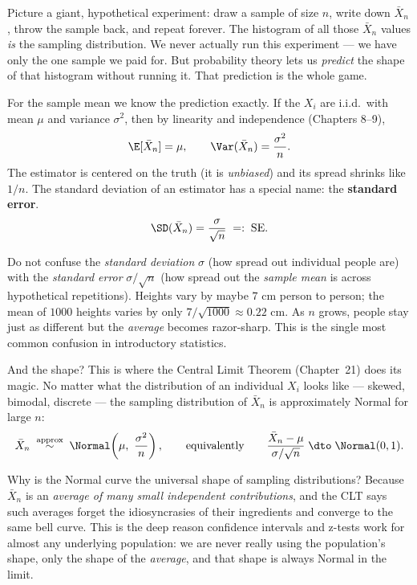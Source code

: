 \begin{intuitionbox}
Picture a giant, hypothetical experiment: draw a sample of size $n$, write down
$\bar X_n$, throw the sample back, and repeat forever. The histogram of all those
$\bar X_n$ values \emph{is} the sampling distribution. We never actually run this
experiment --- we have only the one sample we paid for. But probability theory lets us
\emph{predict} the shape of that histogram without running it. That prediction is the
whole game.
\end{intuitionbox}

For the sample mean we know the prediction exactly. If the $X_i$ are i.i.d.\ with mean
$\mu$ and variance $\sigma^2$, then by linearity and independence (Chapters 8--9),
\[
  \E[\bar X_n] = \mu, \qquad \Var(\bar X_n) = \frac{\sigma^2}{n}.
\]
The estimator is centered on the truth (it is \emph{unbiased}) and its spread shrinks
like $1/n$. The standard deviation of an estimator has a special name: the
\textbf{standard error}.
\[
  \SD(\bar X_n) = \frac{\sigma}{\sqrt n} \;=:\; \mathrm{SE}.
\]

\begin{trapbox}
Do not confuse the \emph{standard deviation} $\sigma$ (how spread out individual people
are) with the \emph{standard error} $\sigma/\sqrt n$ (how spread out the \emph{sample
mean} is across hypothetical repetitions). Heights vary by maybe $7$ cm person to
person; the mean of $1000$ heights varies by only $7/\sqrt{1000}\approx 0.22$ cm. As
$n$ grows, people stay just as different but the \emph{average} becomes razor-sharp.
This is the single most common confusion in introductory statistics.
\end{trapbox}

And the shape? This is where the Central Limit Theorem (Chapter~21) does its magic. No
matter what the distribution of an individual $X_i$ looks like --- skewed, bimodal,
discrete --- the sampling distribution of $\bar X_n$ is approximately Normal for large
$n$:
\[
  \bar X_n \;\overset{\text{approx}}{\sim}\; \Normal\!\left(\mu,\ \frac{\sigma^2}{n}\right),
  \qquad\text{equivalently}\qquad
  \frac{\bar X_n - \mu}{\sigma/\sqrt n} \;\dto\; \Normal(0,1).
\]

\begin{whybox}
Why is the Normal curve the universal shape of sampling distributions? Because
$\bar X_n$ is an \emph{average of many small independent contributions}, and the CLT
says such averages forget the idiosyncrasies of their ingredients and converge to the
same bell curve. This is the deep reason confidence intervals and z-tests work for
almost any underlying population: we are never really using the population's shape, only
the shape of the \emph{average}, and that shape is always Normal in the limit.
\end{whybox}

